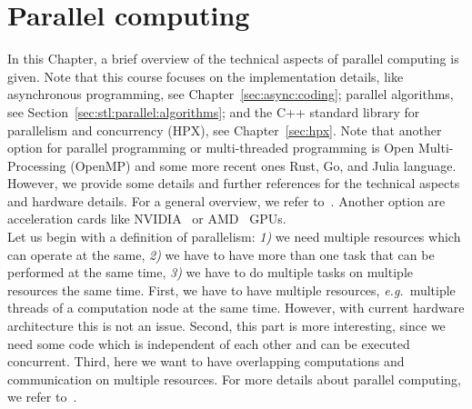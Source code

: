 \chapter{Parallel computing}
In this Chapter, a brief overview of the technical aspects of parallel computing is given. Note that this course focuses on the implementation details, like asynchronous programming, see Chapter~\ref{sec:async:coding}; parallel algorithms, see Section~\ref{sec:stl:parallel:algorithms}; and the C++ standard library for parallelism and concurrency (HPX), see Chapter~\ref{sec:hpx}. Note that another option for parallel programming or multi-threaded programming is Open Multi-Processing (OpenMP) and some more recent ones Rust, Go, and Julia language. However, we provide some details and further references for the technical aspects and hardware details. For a general overview, we refer to~\cite{kumar1994introduction}. Another option are acceleration cards like NVIDIA\textregistered~ or AMD\textregistered~ GPUs.\\

Let us begin with a definition of parallelism: \textit{1)} we need multiple resources which can operate at the same, \textit{2)} we have to have more than one task that can be performed at the same time, \textit{3)} we have to do multiple tasks on multiple resources the same time. First, we have to have multiple resources, \emph{e.g.}\ multiple threads of a computation node at the same time. However, with current hardware architecture this is not an issue. Second, this part is more interesting, since we need some code which is independent of each other and can be executed concurrent. Third, here we want to have overlapping computations and communication on multiple resources. For more details about parallel computing, we refer to~\cite{grama2003introduction,trobec2018introduction}.\\

